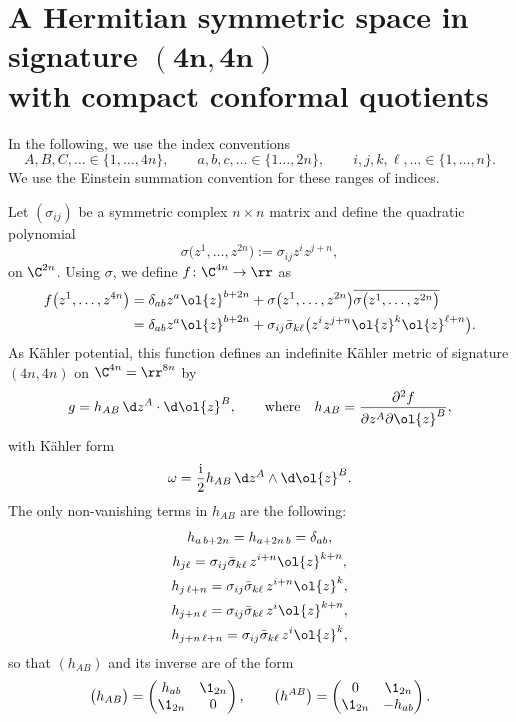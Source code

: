 \section[A Hermitian symmetric space in signature (4n,4n) with compact conformal quotients]{A Hermitian symmetric space in signature $\boldsymbol{(4n,4n)}$ \\ with compact conformal quotients}
 In the following, we use the index conventions
\[A,B,C,\ldots \in \{1,\ldots, 4n\},\qquad a,b,c,\ldots\in \{1\ldots ,2n\},\qquad i,j,k,\ell,\ldots\in \{1,\ldots, n\}.\] We use the Einstein summation convention for these ranges of indices.

Let $(\sigma_{ij})$ be a symmetric complex $n\times n$ matrix and define the quadratic polynomial
\[\sigma\bigl(z^1,\ldots, z^{2n}\bigr):= \sigma_{ij}z^{i}z^{j+n},\]
on $\C^{2n}$.
Using $\sigma$, we define
 $f \colon \C^{4n}\to \rr$ as
\begin{align}
f\bigl(z^1,\ldots , z^{4n}\bigr)
&{}=
\delta_{ab} z^a\ol{z}^{b+2n}+
\sigma\bigl(z^1,\ldots, z^{2n}\bigr)\overline{\sigma\bigl(z^1,\ldots, z^{2n}\bigr)}
\nonumber\\
&{}=
\delta_{ab} z^a\ol{z}^{b+2n}
+
\sigma_{ij}\bar{\sigma}_{k\ell}\bigl(
 z^{i}z^{j+n}\ol{z}^{k} \ol{z}^{\ell+n}\bigr).\label{potential}
\end{align}
As K\"{a}hler potential, this function defines an indefinite K\"ahler metric of signature $(4n,4n)$ on $\C^{4n}=\rr^{8n}$ by
\begin{gather}\label{metric}
g= h_{AB} \,
 \d z^A \cdot \d \ol{z}^B,\qquad \text{where} \quad h_{AB}=\frac{\partial^2 f}{\partial z^A\partial \ol{z}^B},
 \end{gather}
with K\"{a}hler form
 \begin{align*}
\omega
=
\frac{\mathrm{i}}{2} h_{AB}\,
 \d z^A \wedge \d \ol{z}^B.
\end{align*}
The only non-vanishing terms in $h_{AB}$ are the following:
\begin{gather}
h_{a\, b+2n} = h_{a+2n\, b} = \delta_{ab},
\nonumber\\
h_{j\ell} =
\sigma_{ij}\bar{\sigma}_{k\ell}\,
 z^{i+n}\ol{z}^{k+n},
\nonumber\\
h_{j\, \ell+n} =
\sigma_{ij}\bar{\sigma}_{k\ell}\,
 z^{i+n}\ol{z}^{k},
\nonumber\\
h_{j+n\,\ell} =
\sigma_{ij}\bar{\sigma}_{k\ell}\,
 z^{i}\ol{z}^{k+n},
\nonumber\\
h_{j+n\, \ell+n} =
\sigma_{ij}\bar{\sigma}_{k\ell}\,
 z^{i}\ol{z}^{k},
\label{metriccoeff}
\end{gather}
so that {$(h_{AB})$} and its inverse are of the form
\[
{\bigl(h_{AB}\bigr)}=\begin{pmatrix} h_{ab} &\1_{2n} \\ \1_{2n} & 0\end{pmatrix},
\qquad
{\bigl(h^{AB}\bigr)}=\begin{pmatrix} 0 &\1_{2n} \\ \1_{2n} & -h_{ab}\end{pmatrix}.
\]

